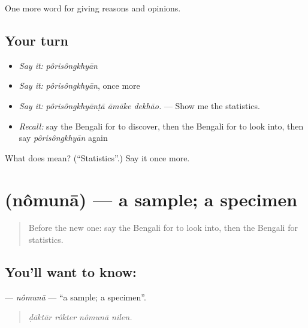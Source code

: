 \begin{grammarlens}[title={What you've built}]
One more word for giving reasons and opinions.
\end{grammarlens}

\subsection*{Your turn}
\begin{itemize}
\raggedright
  \item \emph{Say it:} \emph{pôrisôngkhyān}
  \item \emph{Say it:} \emph{pôrisôngkhyān}, once more
  \item \emph{Say it:} \emph{pôrisôngkhyānṭā āmāke dekhāo.} — Show me the statistics.
  \item \emph{Recall:} say the Bengali for to discover, then the Bengali for to look into, then say \emph{pôrisôngkhyān} again
\end{itemize}

\begin{tcolorbox}[breakable,colback=teal!4,colframe=teal!35!black,title={Before you move on}]
What does  mean? (\textquotedblleft{}Statistics\textquotedblright{}.) Say it once more.
\end{tcolorbox}
\section[\texorpdfstring{\bn{নমুনা} (nômunā)}{নমুনা (nômunā)}]{ (nômunā) — a sample; a specimen}

\label{lesson:BN-C355-nomuna}



\begin{quote}
Before the new one: say the Bengali for to look into, then the Bengali for statistics.
\end{quote}

\subsection*{You'll want to know: }
\textbf{} — \emph{nômunā} — \textquotedblleft{}a sample; a specimen\textquotedblright{}.

\begin{quote}
   
\end{quote}

\begin{quote}
\emph{ḍāktār rôkter nômunā nilen.}
\end{quote}

